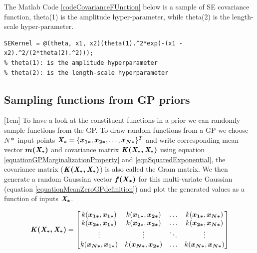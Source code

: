 The Matlab Code \ref{codeCovarianceFUnction} below is a sample of SE covariance function, theta(1) is the amplitude hyper-parameter, while theta(2) is the length-scale hyper-parameter.
\begin{mdframed}[hidealllines=true,backgroundcolor=lightgray!20]
\begin{lstlisting}[caption={A SE covariance function}, 
                    captionpos=b, 
                    label={codeCovarianceFUnction},
                    style=Matlab-editor, 
                    basicstyle=\color{black}\ttfamily\small,
                    backgroundcolor = \color{MatlabCellColour}]
% Standard exponential covariance function
SEKernel = @(theta, x1, x2)(theta(1).^2*exp(-(x1 - x2).^2/(2*theta(2).^2))); 
% theta(1): is the amplitude hyperparameter
% theta(2): is the length-scale hyperparameter
\end{lstlisting}
\end{mdframed}

\subsection{Sampling functions from GP priors}\label{subSecSamplingFunctionsGPPrior}
[1cm]
To have a look at the constituent functions in a prior we can randomly sample functions from the GP. To draw random functions from a GP we choose $N*$ input points $\bm{\mathit{X_{*}}} = \{\boldsymbol{x_{1*}}, \boldsymbol{x_{2*}}, \ldots , \boldsymbol{x_{N*}}\}^T$ and write corresponding mean vector $\boldsymbol{m(\bm{\mathit{X_{*}}})}$ and covariance matrix $\bm{\mathit{K(X_{*}, X_{*} )}}$ using equation \ref{equationGPMarginalizationProperty} and \ref{eqnSquaredExponential}, the covariance matrix ($\bm{\mathit{K(X_{*}, X_{*} )}}$) is also called the Gram matrix. We then generate a random Gaussian vector $\boldsymbol{f(X_{*})}$ for this multi-variate Gaussian (equation \ref{equationMeanZeroGPdefinition}) and plot the generated values as a function of inputs $\bm{\mathit{X_{*}}}$. 

\begin{equation}\label{eqnCovMatrixSquaredExponential}
\bm{\mathit{K(X_{*}, X_{*} )}} = \left [ \begin{matrix}
k(\boldsymbol{x_{1*}}, \boldsymbol{x_{1*}}) & k(\boldsymbol{x_{1*}}, \boldsymbol{x_{2*}}) & \ldots & k(\boldsymbol{x_{1*}}, \boldsymbol{x_{N*}})
\\ k(\boldsymbol{x_{2*}}, \boldsymbol{x_{1*}}) & k(\boldsymbol{x_{2*}}, \boldsymbol{x_{2*}}) & \ldots & k(\boldsymbol{x_{2*}}, \boldsymbol{x_{N*}})
\\ \vdots & \vdots & \ddots & \vdots
\\ k(\boldsymbol{x_{N*}}, \boldsymbol{x_{1*}}) & k(\boldsymbol{x_{N*}}, \boldsymbol{x_{2*}}) & \ldots & k(\boldsymbol{x_{N*}}, \boldsymbol{x_{N*}})
\end{matrix} \right ] 
\end{equation}


